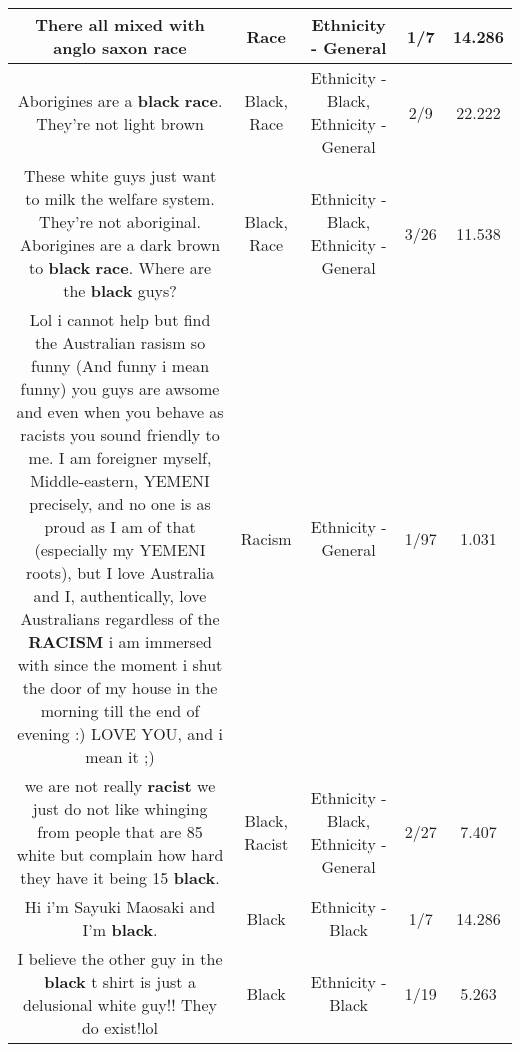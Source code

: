 \documentclass[11pt]{article}
\newlength\mylength
\begin{document}
\begin{center}
\begin{longtable}{|C{.65\mylength}|C{.30\mylength}|C{.12\mylength}|C{.12\mylength}|C{.12\mylength}|}
  \small There all mixed with anglo saxon race\normalsize   & Race & Ethnicity - General & 1/7 & 14.286 \\  \hline
  \small Aborigines are a \textbf{black} \textbf{race}. They're not light brown\normalsize   & Black, Race & Ethnicity - Black, Ethnicity - General & 2/9 & 22.222 \\  \hline
  \small These white guys just want to milk the welfare system. They're not aboriginal. Aborigines are a dark brown to \textbf{black} \textbf{race}. Where are the \textbf{black} guys?\normalsize   & Black, Race & Ethnicity - Black, Ethnicity - General & 3/26 & 11.538 \\  \hline
  \small Lol i cannot help but find the Australian rasism so funny (And  funny i mean funny)  you guys are awsome and even when you behave as racists you sound friendly to me. I am foreigner myself, Middle-eastern, YEMENI precisely, and no one is as proud as I am of that (especially my YEMENI roots), but I love Australia and I, authentically, love Australians regardless of the \textbf{RACISM}  i am immersed with since the moment i shut the door of my house in the morning till the end of evening :) LOVE YOU, and i mean it ;)\normalsize   & Racism & Ethnicity - General & 1/97 & 1.031 \\  \hline
  \small we are not really \textbf{racist} we just do not like whinging from people that are 85 white but complain how hard they have it being 15 \textbf{black}.\normalsize   & Black, Racist & Ethnicity - Black, Ethnicity - General & 2/27 & 7.407 \\  \hline
  \small Hi i'm Sayuki Maosaki and I'm \textbf{black}.\normalsize   & Black & Ethnicity - Black & 1/7 & 14.286 \\  \hline
  \small I believe the other guy in the \textbf{black} t shirt is just a delusional white guy!! They do exist!lol\normalsize   & Black & Ethnicity - Black & 1/19 & 5.263 \\  \hline

\end{longtable}
\end{center}
\end{document}
